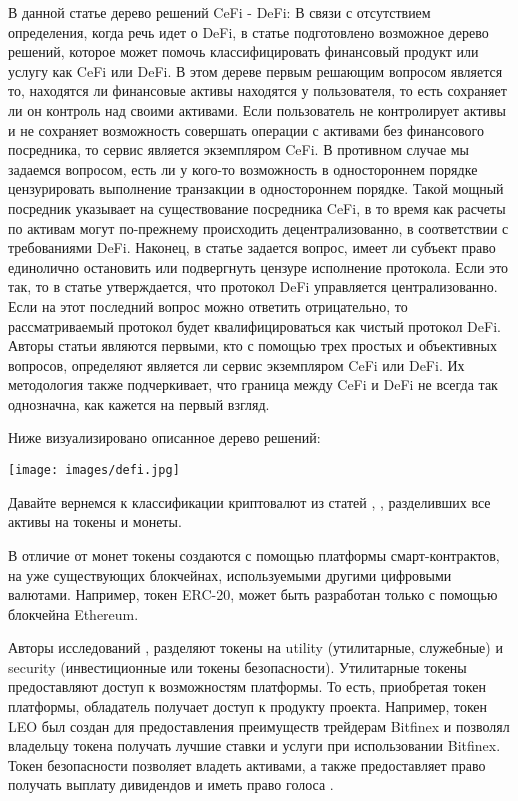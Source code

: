 \documentclass[14pt, a4paper]{extarticle}
\begin{document}
В данной статье дерево решений CeFi - DeFi: В связи с отсутствием определения, когда речь идет о DeFi, в статье подготовлено  возможное дерево решений, которое может помочь классифицировать финансовый продукт или услугу как CeFi или DeFi. В этом дереве первым решающим вопросом является то, находятся ли финансовые активы находятся у пользователя, то есть сохраняет ли он контроль над своими активами. Если пользователь не контролирует активы и не сохраняет возможность совершать операции с активами без финансового посредника, то сервис является экземпляром CeFi. В противном случае мы задаемся вопросом, есть ли у кого-то возможность в одностороннем порядке цензурировать выполнение транзакции в одностороннем порядке. Такой мощный посредник указывает на существование посредника CeFi, в то время как расчеты по активам могут по-прежнему происходить децентрализованно, в соответствии с требованиями DeFi. Наконец, в статье задается вопрос, имеет ли субъект право единолично остановить или подвергнуть цензуре исполнение протокола. Если это так, то в статье утверждается, что протокол DeFi управляется централизованно. Если на этот последний вопрос можно ответить отрицательно, то рассматриваемый протокол будет квалифицироваться как чистый протокол DeFi. Авторы статьи являются первыми, кто с помощью трех простых и объективных вопросов, определяют является ли сервис экземпляром CeFi или DeFi. Их методология также подчеркивает, что граница между CeFi и DeFi не всегда так однозначна, как кажется на первый взгляд. 

Ниже визуализировано описанное дерево решений:

\texttt{[image: images/defi.jpg]}

Давайте вернемся к классификации криптовалют из статей \cite{mukhopadhyay2018ethereum},  \cite{victor2019measuring}, разделивших все активы на токены и монеты.

В отличие от монет токены создаются с помощью платформы смарт-контрактов, на уже существующих блокчейнах, используемыми другими цифровыми валютами. Например, токен ERC-20, может быть разработан только с помощью блокчейна Ethereum\cite{mukhopadhyay2018ethereum}. 

Авторы исследований \cite{sockin2023model}, \cite{howell2020initial} разделяют токены на utility (утилитарные, служебные) и security (инвестиционные или токены безопасности). Утилитарные токены предоставляют доступ к возможностям платформы. То есть, приобретая токен платформы, обладатель получает доступ к продукту проекта.  Например, токен LEO был создан для предоставления преимуществ трейдерам Bitfinex и позволял владельцу токена получать лучшие ставки и услуги при использовании Bitfinex. Токен безопасности позволяет владеть активами, а также предоставляет право получать выплату дивидендов и иметь право голоса \cite{dos2021bibliometric}. 
\end{document}
